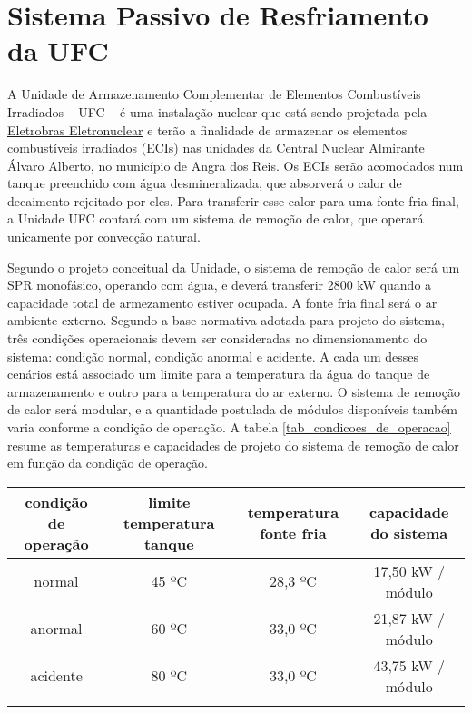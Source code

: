 \documentclass[a4paper,portuguese,10pt]{article}
\begin{document}

\section{Sistema Passivo de Resfriamento da UFC}

A Unidade de Armazenamento Complementar de Elementos Combustíveis Irradiados -- UFC -- é uma instalação nuclear que está sendo projetada pela \href{www.eletronuclear.gov.br}{Eletrobras Eletronuclear} e terão a finalidade de armazenar os elementos combustíveis irradiados (ECIs) nas unidades da Central Nuclear Almirante Álvaro Alberto, no município de Angra dos Reis. Os ECIs serão acomodados num tanque preenchido com água desmineralizada, que absorverá o calor de decaimento rejeitado por eles. Para transferir esse calor para uma fonte fria final, a Unidade UFC contará com um sistema de remoção de calor, que operará unicamente por convecção natural. 

Segundo o projeto conceitual da Unidade, o sistema de remoção de calor será um SPR monofásico, operando com água, e deverá transferir 2800 kW quando a capacidade total de armezamento estiver ocupada. A fonte fria final será o ar ambiente externo. Segundo a base normativa adotada para projeto do sistema, três condições operacionais devem ser consideradas no dimensionamento do sistema: condição normal, condição anormal e acidente. A cada um desses cenários está associado um limite para a temperatura da água do tanque de armazenamento e outro para a temperatura do ar externo. O sistema de remoção de calor será modular, e a quantidade postulada de módulos disponíveis também varia conforme a condição de operação. A tabela \ref{tab_condicoes_de_operacao} resume as temperaturas e capacidades de projeto do sistema de remoção de calor em função da condição de operação.

\begin{center}
\begin{tabular}{cccc}
  \hline
  condição de operação & limite temperatura tanque & temperatura fonte fria & capacidade do sistema\\
  \hline
  normal   & 45 ºC & 28,3 ºC & 17,50 kW / módulo\\
  anormal  & 60 ºC & 33,0 ºC & 21,87 kW / módulo\\
  acidente & 80 ºC & 33,0 ºC & 43,75 kW / módulo\\
  \hline\\
\end{tabular}
\label{tab_condicoes_de_operacao}
\end{center}
\end{document}
